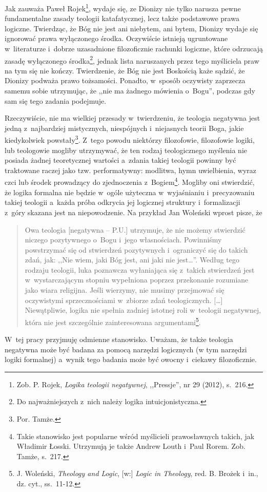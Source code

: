 Jak zauważa Paweł Rojek\footnote{Zob. P. Rojek, \textit{Logika teologii negatywnej}, ,,Pressje'', nr 29 (2012), s.~216.}, wydaje się, ze Dionizy nie tylko narusza pewne fundamentalne zasady teologii katafatycznej, lecz także podstawowe prawa logiczne. Twierdząc, że Bóg nie jest ani niebytem, ani bytem, Dionizy wydaje się ignorować prawa wyłączonego środka. Oczywiście istnieją ugruntowane w~literaturze i~dobrze uzasadnione filozoficznie rachunki logiczne, które odrzucają zasadę wyłączonego środka\footnote{Do najważniejszych z~nich należy logika intuicjonistyczna.}, jednak lista naruszanych przez tego myśliciela praw na tym się nie kończy. Twierdzenie, że Bóg nie jest Boskością każe sądzić, że Dionizy podważa prawo tożsamości. Ponadto, w~sposób oczywisty zaprzecza samemu sobie utrzymując, że ,,nie ma żadnego mówienia o~Bogu'', podczas gdy sam się tego zadania podejmuje.

Rzeczywiście, nie ma wielkiej przesady w~twierdzeniu, że teologia negatywna jest jedną z~najbardziej mistycznych, niespójnych i~niejasnych teorii Boga, jakie kiedykolwiek powstały\footnote{Por. Tamże. }. Z~tego powodu niektórzy filozofowie, filozofowie logiki, lub teologowie mogliby utrzymywać, że ten rodzaj teologicznego myślenia nie posiada żadnej teoretycznej wartości a~zdania takiej teologii powinny być traktowane raczej jako tzw. performatywny: modlitwa, hymn uwielbienia, wyraz czci lub środek prowadzący do zjednoczenia z~Bogiem\footnote{Takie stanowisko jest popularne wśród myślicieli prawosławnych takich, jak Władimir Łosski. Utrzymują je także Andrew Louth i~Paul Rorem. Zob. Tamże, s.~217.}. Mogliby oni stwierdzić, że logika formalna nie będzie w~ogóle użyteczna w~wyjaśnianiu i~precyzowaniu takiej teologii a~każda próba odkrycia jej logicznej struktury i~formalizacji z~góry skazana jest na niepowodzenie. Na przykład Jan Woleński wprost pisze, że

\begin{quote}
Owa teologia [negatywna -- P.U.] utrzymuje, że nie możemy stwierdzić niczego pozytywnego o~Bogu i~jego własnościach. Powinniśmy powstrzymać się od stwierdzeń pozytywnych i~ograniczyć się do takich zdań, jak: ,,Nie wiem, jaki Bóg jest, ani jaki nie jest\ldots''. Według tego rodzaju teologii, luka poznawcza wyłaniająca się z~takich stwierdzeń jest w~wystarczającym stopniu wypełniona poprzez przekonanie rozumiane jako wiara religijna. Jeśli wierzymy, nie musimy przejmować się oczywistymi sprzecznościami w~zbiorze zdań teologicznych. [\ldots] Niewątpliwie, logika nie spełnia zadniej istotnej roli w~teologii negatywnej, która nie jest szczególnie zainteresowana argumentami\footnote{J. Woleński, \textit{Theology and Logic}, [w:] \textit{Logic in Theology}, red. B. Brożek i~in., dz. cyt., ss.~11-12.}.
\end{quote}
W~tej pracy przyjmuję odmienne stanowisko. Uważam, że także teologia negatywna może być badana za pomocą narzędzi logicznych (w tym narzędzi logiki formalnej) a~wynik tego badania może być owocny i~ciekawy filozoficznie.

